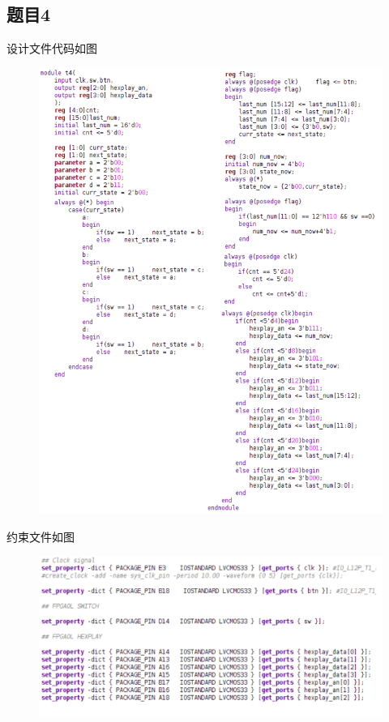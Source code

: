\documentclass{article}
\begin{document}
	\subsection*{题目4}
		设计文件代码如图
		\begin{figure}[htbp]
			\centering
			\includegraphics[scale=0.7]{4v.png}
		\end{figure}

		\clearpage
		约束文件如图
		\begin{figure}[htbp]
			\centering
			\includegraphics[scale=0.8]{4x.png}
		\end{figure}
\end{document}
